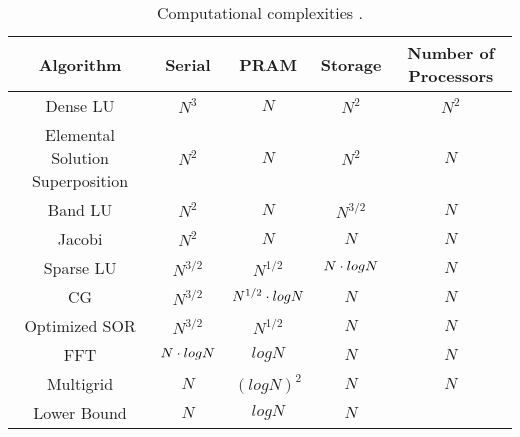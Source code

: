 \cp

\begin{table}[hbtp]%
\small
\begin{center}
\caption{Computational complexities \cite{Demmel1997}.}
\begin{tabular}{ccccc} \hline
   Algorithm  &  Serial  &  PRAM  &  Storage  &  Number of Processors \\ \hline
Dense LU      &   $N^3$   &  $N$            & $N^2$     & $N^2$ \\
Elemental Solution Superposition\footnotemark[1]         &   $N^2$   &  $N$            & $N^2$ & $N$   \\
Band LU     &   $N^2$   &  $N$            & $N^{3/2}$ & $N$   \\
Jacobi      &   $N^2$   &  $N$            & $N$       & $N$   \\
Sparse LU   & $N^{3/2}$ & $N^{1/2}$       & $N \cdot log N$ & $N$   \\
CG          & $N^{3/2}$ & $N^{1/2} \cdot log N$ & $N$       & $N$   \\
Optimized SOR         & $N^{3/2}$ & $N^{1/2}$       & $N$       & $N$   \\
FFT         & $N \cdot log N$ & $log N$         & $N$       & $N$   \\
Multigrid   & $N$       & $(log N)^2$     & $N$       & $N$   \\
Lower Bound & $N$       & $log N$         & $N$       &       \\ \hline
 \end{tabular}
 \label{tab:complexity}
 \end{center}
 \end{table}

